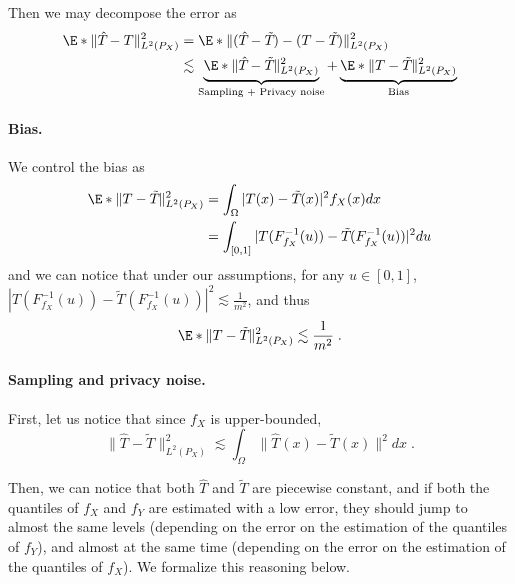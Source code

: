 \documentclass{article}
\newcommand{\1}{\mathds{1}}
\theoremstyle{plain}
\theoremstyle{definition}
\theoremstyle{remark}
\begin{document}
Then we may decompose the error as
\begin{equation}
\begin{aligned}
    \E*{\| \hat{T}_{} - T \|^2_{L^2(P_X)}}
    & = \E*{\| (\hat{T}_{} - \tilde{T}_{}) - (T - \tilde{T}_{})\|^2_{L^2(P_X)}} \\
    &\lesssim 
    \underbrace{\E*{\| \hat{T}_{} - \tilde{T}_{}\|^2_{L^2(P_X)}}}_{\text{Sampling + Privacy noise}} + \underbrace{\E*{\| T - \tilde{T}_{}\|^2_{L^2(P_X)}}}_{\text{Bias}}
\end{aligned}
\end{equation}

\paragraph{Bias.}
We control the bias as 
\begin{equation}
    \begin{aligned}
        \E*{\| T - \tilde{T}_{}\|^2_{L^2(P_X)}}
        &=
        \int_{\Omega}
        | T(x) - \tilde{T}_{}(x)|^2 f_X(x) dx \\
        &=\int_{[0, 1]}
        | T(F_{f_X}^{-1}(u)) - \tilde{T}_{}(F_{f_X}^{-1}(u))|^2 du
    \end{aligned}
\end{equation} 
and we can notice that under our assumptions, for any $u \in [0, 1]$,
$|T(F_{f_X}^{-1}(u)) - \tilde{T}_{}(F_{f_X}^{-1}(u))|^2 \lesssim \frac{1}{m^2}$, and thus 
\begin{equation}
    \E*{\| T - \tilde{T}_{}\|^2_{L^2(P_X)}}
    \lesssim 
    \frac{1}{m^2} \;.
\end{equation}

\paragraph{Sampling and privacy noise.}

First, let us notice that since $f_X$ is upper-bounded,
\begin{equation}
   {\| \hat{T}_{} - \tilde{T}_{}\|^2_{L^2(P_X)}}
    \lesssim
    {\int_{\Omega}\| \hat{T}_{}(x) - \tilde{T}_{}(x)\|^2 dx} \;.
\end{equation}

Then, we can notice that both $\hat{T}$ and $\tilde{T}$ are piecewise constant, and if both the quantiles of $f_X$ and $f_Y$ are estimated with a low error, they should jump to almost the same levels (depending on the error on the estimation of the quantiles of $f_Y$), and almost at the same time (depending on the error on the estimation of the quantiles of $f_X$). We formalize this reasoning below.
\end{document}
